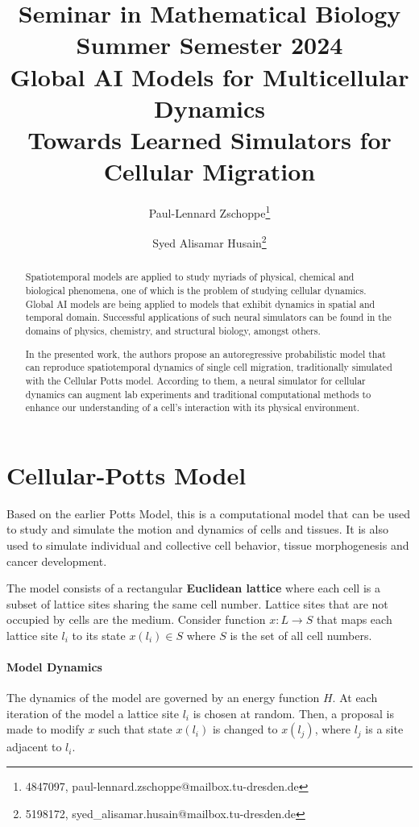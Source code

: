 \documentclass[a4paper,10pt,twocolumn]{article}
\date{}
\title{
    \small
    {\large Seminar in Mathematical Biology}\\
    Summer Semester 2024\\
    \vspace{1em}
    {\LARGE\bfseries Global AI Models for Multicellular Dynamics} \\ 
    {\Large Towards Learned Simulators for Cellular Migration}
}
\author{
    Paul-Lennard Zschoppe\footnote{4847097, paul-lennard.zschoppe@mailbox.tu-dresden.de}\\
    \and
    Syed Alisamar Husain\footnote{5198172, syed\_alisamar.husain@mailbox.tu-dresden.de}\\
}
\begin{document}
    \maketitle

    \begin{abstract}
        Spatiotemporal models are applied to study myriads of physical, chemical and biological
        phenomena, one of which is the problem of studying cellular dynamics.
        Global AI models are being applied to models that exhibit dynamics in spatial 
        and temporal domain. Successful applications of such neural simulators can be found in the 
        domains of physics, chemistry, and structural biology, amongst others. 

        In the presented work, the authors propose an autoregressive probabilistic model that can reproduce 
        spatiotemporal dynamics of single cell migration, traditionally simulated with the 
        Cellular Potts model. 
        According to them, a neural simulator for cellular dynamics can augment lab experiments and 
        traditional computational methods to enhance our understanding of a cell's interaction 
        with its physical environment. 
    \end{abstract}



    \section{Cellular-Potts Model}
        Based on the earlier Potts Model, this is a computational model that can be used to study and simulate
        the motion and dynamics of cells and tissues. It is also used to simulate 
        individual and collective cell behavior, tissue morphogenesis and cancer development.
        
        The model consists of a rectangular {\bfseries Euclidean lattice} where each cell is a subset 
        of lattice sites sharing the same cell number. Lattice sites that are not occupied by 
        cells are the medium. 
        Consider function $x: L \to S$ that maps each lattice site $l_i$ to its state 
        $x(l_i) \in S$ where $S$ is the set of all cell numbers.

        \paragraph{Model Dynamics}
        The dynamics of the model are governed by an energy function $H$.
        At each iteration of the model a lattice site $l_i$ is chosen at random.
        Then, a proposal is made to modify $x$ such that state $x(l_i)$ is changed to 
        $x(l_j)$, where $l_j$ is a site adjacent to $l_i$.
\end{document}
